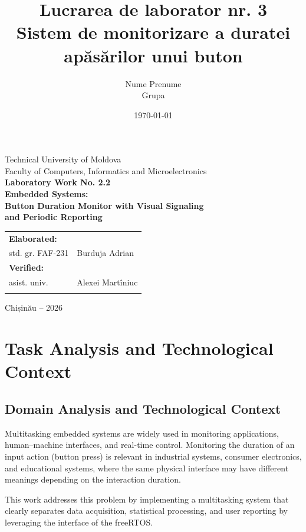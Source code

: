 \documentclass[12pt,a4paper]{article}
\title{Lucrarea de laborator nr. 3\\
Sistem de monitorizare a duratei apăsărilor unui buton}
\author{Nume Prenume\\Grupa}
\date{\today}
\begin{document}
\begin{titlepage}
\begin{center}
\vspace*{1cm}
{\Large Technical University of Moldova}\\[0.5cm]
{\Large Faculty of Computers, Informatics and Microelectronics}\\[2cm]
{\Huge\bfseries Laboratory Work No. 2.2}\\[1cm]
{\Large\bfseries Embedded Systems:\\
Button Duration Monitor with Visual Signaling\\
and Periodic Reporting}\\[3.5cm]
\begin{flushright}
\begin{tabular}{ll}
\textbf{Elaborated:} & \\
std. gr. FAF-231 & Burduja Adrian \\[1cm]
\textbf{Verified:} & \\
asist. univ. & Alexei Martîniuc \\ & \\
\end{tabular}
\end{flushright}
\vfill
{\Large Chișinău -- 2026}
\end{center}
\end{titlepage}
\newpage

\section{Task Analysis and Technological Context}

\subsection{Domain Analysis and Technological Context}
Multitasking embedded systems are widely used in monitoring applications,
human--machine interfaces, and real-time control. Monitoring the duration of an input action
(button press) is relevant in industrial systems, consumer electronics, and educational systems,
where the same physical interface may have different meanings depending on the interaction duration.

This work addresses this problem by implementing a multitasking system that clearly separates
data acquisition, statistical processing, and user reporting by leveraging the interface of the freeRTOS.
\end{document}

